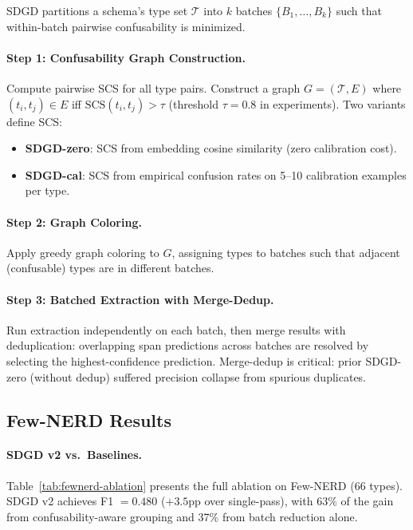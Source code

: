\documentclass[11pt,a4paper]{article}
\begin{document}
SDGD partitions a schema's type set $\mathcal{T}$ into $k$ batches $\{B_1, \ldots, B_k\}$ such that within-batch pairwise confusability is minimized.

\paragraph{Step 1: Confusability Graph Construction.}
Compute pairwise SCS for all type pairs. Construct a graph $G = (\mathcal{T}, E)$ where $(t_i, t_j) \in E$ iff $\text{SCS}(t_i, t_j) > \tau$ (threshold $\tau = 0.8$ in experiments). Two variants define SCS:
\begin{itemize}
\item \textbf{SDGD-zero}: SCS from embedding cosine similarity (zero calibration cost).
\item \textbf{SDGD-cal}: SCS from empirical confusion rates on 5--10 calibration examples per type.
\end{itemize}

\paragraph{Step 2: Graph Coloring.}
Apply greedy graph coloring to $G$, assigning types to batches such that adjacent (confusable) types are in different batches.

\paragraph{Step 3: Batched Extraction with Merge-Dedup.}
Run extraction independently on each batch, then merge results with deduplication: overlapping span predictions across batches are resolved by selecting the highest-confidence prediction.
Merge-dedup is critical: prior SDGD-zero (without dedup) suffered precision collapse from spurious duplicates.

\subsection{Few-NERD Results}

\paragraph{SDGD v2 vs.\ Baselines.}
Table~\ref{tab:fewnerd-ablation} presents the full ablation on Few-NERD (66 types). SDGD v2 achieves F1 $= 0.480$ ($+3.5$pp over single-pass), with 63\% of the gain from confusability-aware grouping and 37\% from batch reduction alone.
\end{document}
